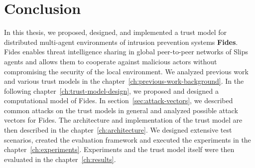 \chapter{Conclusion}
\label{ch:conclusion}
In this thesis, we proposed, designed, and implemented a trust model for distributed multi-agent environments of intrusion prevention systems \textbf{Fides}.
Fides enables threat intelligence sharing in global peer-to-peer networks of Slips agents and allows them to cooperate against malicious actors without compromising the security of the local environment. 
We analyzed previous work and various trust models in the chapter~\ref{ch:previous-work-background}.
In the following chapter~\ref{ch:trust-model-design}, we proposed and designed a computational model of Fides.
In section~\ref{sec:attack-vectors}, we described common attacks on the trust models in general and analyzed possible attack vectors for Fides.
The architecture and implementation of the trust model are then described in the chapter~\ref{ch:architecture}.
We designed extensive test scenarios, created the evaluation framework and executed the experiments in the chapter~\ref{ch:experiments}.
Experiments and the trust model itself were then evaluated in the chapter~\ref{ch:results}.



